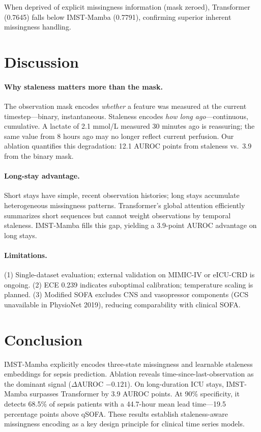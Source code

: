 \documentclass[11pt,a4paper]{article}
\begin{document}
When deprived of explicit missingness information (mask zeroed), Transformer
(0.7645) falls below IMST-Mamba (0.7791), confirming superior inherent
missingness handling.

\section{Discussion}
\label{sec:discussion}

\paragraph{Why staleness matters more than the mask.}
The observation mask encodes \emph{whether} a feature was measured at the
current timestep—binary, instantaneous.  Staleness encodes \emph{how long
ago}—continuous, cumulative.  A lactate of 2.1 mmol/L measured 30 minutes ago
is reassuring; the same value from 8 hours ago may no longer reflect current
perfusion.  Our ablation quantifies this degradation: 12.1 AUROC points from
staleness vs.\ 3.9 from the binary mask.

\paragraph{Long-stay advantage.}
Short stays have simple, recent observation histories; long stays accumulate
heterogeneous missingness patterns.  Transformer's global attention efficiently
summarizes short sequences but cannot weight observations by temporal staleness.
IMST-Mamba fills this gap, yielding a 3.9-point AUROC advantage on long stays.

\paragraph{Limitations.}
(1) Single-dataset evaluation; external validation on MIMIC-IV or eICU-CRD is
ongoing.  (2) ECE 0.239 indicates suboptimal calibration; temperature scaling
is planned.  (3) Modified SOFA excludes CNS and vasopressor components
(GCS unavailable in PhysioNet 2019), reducing comparability with clinical SOFA.

\section{Conclusion}
\label{sec:conclusion}

IMST-Mamba explicitly encodes three-state missingness and learnable staleness
embeddings for sepsis prediction.  Ablation reveals time-since-last-observation
as the dominant signal ($\Delta$AUROC $-0.121$).  On long-duration ICU stays,
IMST-Mamba surpasses Transformer by 3.9 AUROC points.  At 90\% specificity,
it detects 68.5\% of sepsis patients with a 44.7-hour mean lead time—19.5
percentage points above qSOFA.  These results establish staleness-aware
missingness encoding as a key design principle for clinical time series models.



\end{document}
